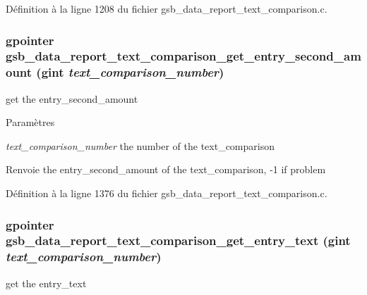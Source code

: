 Définition à la ligne 1208 du fichier gsb\_\-data\_\-report\_\-text\_\-comparison.c.

\subsubsection[{gsb\_\-data\_\-report\_\-text\_\-comparison\_\-get\_\-entry\_\-second\_\-amount}]{\setlength{\rightskip}{0pt plus 5cm}gpointer gsb\_\-data\_\-report\_\-text\_\-comparison\_\-get\_\-entry\_\-second\_\-amount (gint {\em text\_\-comparison\_\-number})}\label{gsb__data__report__text__comparison_8c_a171d77b0c4ab46cd9a2468dc815da11a}
get the entry\_\-second\_\-amount


\begin{DoxyParams}{Paramètres}
\item[{\em text\_\-comparison\_\-number}]the number of the text\_\-comparison\end{DoxyParams}
\begin{DoxyReturn}{Renvoie}
the entry\_\-second\_\-amount of the text\_\-comparison, -\/1 if problem 
\end{DoxyReturn}


Définition à la ligne 1376 du fichier gsb\_\-data\_\-report\_\-text\_\-comparison.c.

\subsubsection[{gsb\_\-data\_\-report\_\-text\_\-comparison\_\-get\_\-entry\_\-text}]{\setlength{\rightskip}{0pt plus 5cm}gpointer gsb\_\-data\_\-report\_\-text\_\-comparison\_\-get\_\-entry\_\-text (gint {\em text\_\-comparison\_\-number})}\label{gsb__data__report__text__comparison_8c_a9127cedf50ca4d5230e9c69c833a1e87}
get the entry\_\-text



